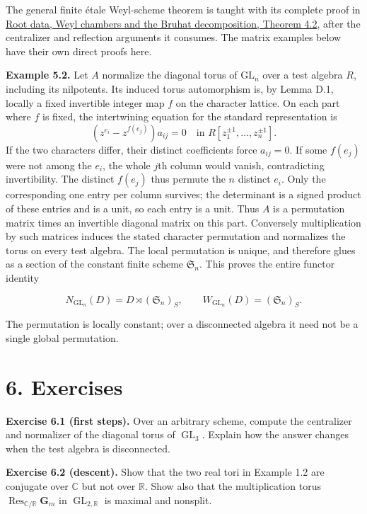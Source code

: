 \documentclass[11pt,a4paper,openany]{report}
\begin{document}
The general finite étale Weyl-scheme theorem is taught with its complete proof in \href{https://github.com/KokunoYumeto/open-math-courses/blob/main/docs/courses/AG-RG/AG-RG-04.md\#4-borel-subgroups-are-positive-systems}{Root data, Weyl chambers and the Bruhat decomposition, Theorem 4.2}, after the centralizer and reflection arguments it consumes. The matrix examples below have their own direct proofs here.

\textbf{Example 5.2.} Let \(A\) normalize the diagonal torus of \(\mathrm{GL}_n\) over a test algebra \(R\), including its nilpotents. Its induced torus automorphism is, by Lemma D.1, locally a fixed invertible integer map \(f\) on the character lattice. On each part where \(f\) is fixed, the intertwining equation for the standard representation is \[
 (z^{e_i}-z^{f(e_j)})a_{ij}=0\quad\text{in }R[z_1^{\pm1},\ldots,z_n^{\pm1}].
\] If the two characters differ, their distinct coefficients force \(a_{ij}=0\). If some \(f(e_j)\) were not among the \(e_i\), the whole \(j\)th column would vanish, contradicting invertibility. The distinct \(f(e_j)\) thus permute the \(n\) distinct \(e_i\). Only the corresponding one entry per column survives; the determinant is a signed product of these entries and is a unit, so each entry is a unit. Thus \(A\) is a permutation matrix times an invertible diagonal matrix on this part. Conversely multiplication by such matrices induces the stated character permutation and normalizes the torus on every test algebra. The local permutation is unique, and therefore glues as a section of the constant finite scheme \(\mathfrak S_n\). This proves the entire functor identity

\[
N_{\operatorname{GL}_n}(D)=D\rtimes(\mathfrak S_n)_S,\qquad
W_{\operatorname{GL}_n}(D)=(\mathfrak S_n)_S.
\]

The permutation is locally constant; over a disconnected algebra it need not be a single global permutation.

\section{6. Exercises}\label{AG-RG-01-exercises}

\textbf{Exercise 6.1 (first steps).} Over an arbitrary scheme, compute the centralizer and normalizer of the diagonal torus of \(\operatorname{GL}_3\). Explain how the answer changes when the test algebra is disconnected.

\textbf{Exercise 6.2 (descent).} Show that the two real tori in Example 1.2 are conjugate over \(\mathbb C\) but not over \(\mathbb R\). Show also that the multiplication torus \(\operatorname{Res}_{\mathbb C/\mathbb R}\mathbf G_m\) in \(\operatorname{GL}_{2,\mathbb R}\) is maximal and nonsplit.
\end{document}
